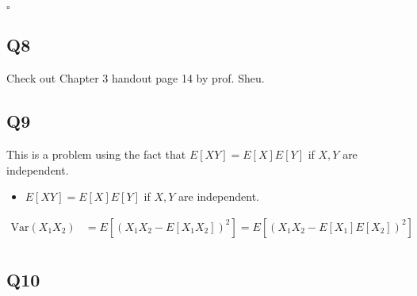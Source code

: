 \documentclass[12pt]{article}
\begin{document}
\hspace{\textwidth}\(\square\) 
\subsection*{Q8}
Check out Chapter 3 handout page 14 by prof. Sheu. 
\subsection*{Q9}
This is a problem using the fact that \textbf{\(E[XY] = E[X]E[Y]\) } if \(X,Y\) are independent. 
\begin{itemize}
    \item  \textbf{\(E[XY] = E[X]E[Y]\) } if \(X,Y\) are independent.
\end{itemize}


\begin{equation*}
    \begin{aligned}
        \text{Var} (X_1 X_2) &= E[(X_1 X_2 - E[X_1 X_2])^2] = E[(X_{1} X_2 - E[X_1]E[X_2] )^2]
        \\ &
    \end{aligned}
\end{equation*}
\subsection*{Q10}
\end{document}
